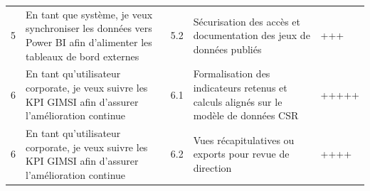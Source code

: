 \begin{longtable}{@{}p{0.6cm}p{4.0cm}p{1.0cm}p{7.8cm}p{1.4cm}@{}}
5 & En tant que système, je veux synchroniser les données vers Power BI afin d'alimenter les tableaux de bord externes & 5.2 & Sécurisation des accès et documentation des jeux de données publiés & +++ \\
6 & En tant qu'utilisateur corporate, je veux suivre les KPI GIMSI afin d'assurer l'amélioration continue & 6.1 & Formalisation des indicateurs retenus et calculs alignés sur le modèle de données CSR & +++++ \\
6 & En tant qu'utilisateur corporate, je veux suivre les KPI GIMSI afin d'assurer l'amélioration continue & 6.2 & Vues récapitulatives ou exports pour revue de direction & ++++ \\
\end{longtable}
\endgroup
